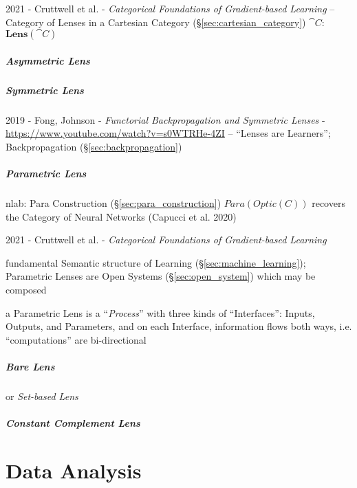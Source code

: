 2021 - Cruttwell et al. - \emph{Categorical Foundations of Gradient-based
Learning} -- Category of Lenses in a Cartesian Category
(\S\ref{sec:cartesian_category}) $\cat{C}$: $\mathbf{Lens}(\cat{C})$



\subparagraph{Asymmetric Lens}\label{sec:asymmetric_lens}\hfill

\subparagraph{Symmetric Lens}\label{sec:symmetric_lens}\hfill

2019 - Fong, Johnson - \emph{Functorial Backpropagation and Symmetric Lenses} -
\url{https://www.youtube.com/watch?v=s0WTRHe-4ZI} -- ``Lenses are Learners'';
\fist Backpropagation (\S\ref{sec:backpropagation})



\subparagraph{Parametric Lens}\label{sec:parametric_lens}\hfill


nlab: Para Construction (\S\ref{sec:para_construction}) $Para(Optic(C))$
recovers the Category of Neural Networks (Capucci et al. 2020)

2021 - Cruttwell et al. - \emph{Categorical Foundations of Gradient-based
Learning}

fundamental Semantic structure of Learning (\S\ref{sec:machine_learning});
Parametric Lenses are Open Systems (\S\ref{sec:open_system}) which may be
composed

a Parametric Lens is a ``\emph{Process}'' with three kinds of ``Interfaces'':
Inputs, Outputs, and Parameters, and on each Interface, information flows both
ways, i.e. ``computations'' are bi-directional



\subparagraph{Bare Lens}\label{sec:bare_lens}\hfill

or \emph{Set-based Lens}



\subparagraph{Constant Complement Lens}
\label{sec:constant_complement_lens}\hfill



\section{Data Analysis}\label{sec:data_analysis}

